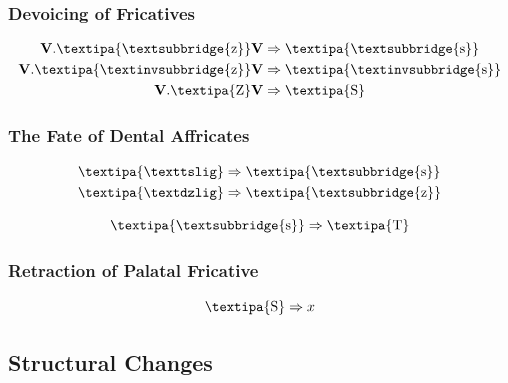\documentclass{report}[12pt]
\begin{document}
\subsubsection{Devoicing of Fricatives}

\begin{tcolorbox}
  \begin{align*}
  \textbf{V}.\text{\textipa{\textsubbridge{z}}}\textbf{V} & \Rightarrow \text{\textipa{\textsubbridge{s}}} \\
  \textbf{V}.\text{\textipa{\textinvsubbridge{z}}}\textbf{V} & \Rightarrow \text{\textipa{\textinvsubbridge{s}}} \\
  \textbf{V}.\text{\textipa{Z}}\textbf{V} & \Rightarrow \text{\textipa{S}} \\
  \end{align*}
\end{tcolorbox}

\subsubsection{The Fate of Dental Affricates}

\begin{tcolorbox}
  \begin{align*}
    \text{\textipa{\texttslig}} & \Rightarrow \text{\textipa{\textsubbridge{s}}} \\
    \text{\textipa{\textdzlig}} & \Rightarrow \text{\textipa{\textsubbridge{z}}} \\
  \end{align*}
\end{tcolorbox}

\begin{tcolorbox}
  \[ \text{\textipa{\textsubbridge{s}}} \Rightarrow \text{\textipa{T}} \]
\end{tcolorbox}

\subsubsection{Retraction of Palatal Fricative}

\begin{tcolorbox}
  \[ \text{\textipa{S}} \Rightarrow x \]  
\end{tcolorbox}

\subsection{Structural Changes}
\end{document}
